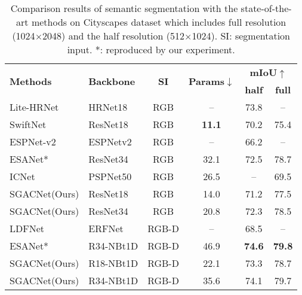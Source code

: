 \documentclass[journal,twoside,web]{ieeecolor}
\begin{document}
\begin{table}[!t]
	\centering
	\renewcommand{\arraystretch}{1.08}\caption{Comparison results of semantic segmentation with the state-of-the-art methods on Cityscapes dataset which includes full resolution (1024$\times$2048) and the half resolution (512$\times$1024). SI: segmentation input. *: reproduced by our experiment.}
	\footnotesize
	\begin{tabular}{llcccc}
		\toprule \multicolumn{1}{l}{\multirow{2}{*}{\textbf{Methods}}}     &
		\multicolumn{1}{l}{\multirow{2}{*}{\textbf{Backbone}}}     &
		\multicolumn{1}{c}{\multirow{2}{*}{\textbf{SI}}}     &
		\multicolumn{1}{c}{\multirow{2}{*}{\textbf{Params}$\downarrow$}} 						&
		\multicolumn{2}{c}{\textbf{mIoU$\uparrow$}} \\ 
		\cmidrule(r){5-6} 
		\multicolumn{4}{c}{}                                  &      
		\multicolumn{1}{c}{\textbf{half}}      & 
		\multicolumn{1}{c}{\textbf{full}}	     \\ 
		\midrule
Lite-HRNet~\cite{Lite-HRNet}       & HRNet18          & RGB   & --  &  73.8 &  --       \\
		SwiftNet~\cite{SwiftNet}           & ResNet18   	& RGB   & \textbf{11.1}&  70.2 & 75.4     \\
      ESPNet-v2~\cite{ESPNetv2}          & ESPNetv2   	& RGB   & --  &  66.2 &  --       \\
      ESANet*~\cite{ESANet}              & ResNet34      & RGB   & 32.1&  72.5 & 78.7    \\
		ICNet~\cite{ICNet}                 & PSPNet50  	& RGB   & 26.5 &   --  & 69.5       \\
		SGACNet(Ours)                      & ResNet18  	& RGB   & 14.0&  71.2 &77.5 \\
		SGACNet(Ours)                      & ResNet34  	& RGB   & 20.8&  72.3 & 78.5    \\ 
		\midrule
		LDFNet~\cite{LDFNet}               & ERFNet 	    & RGB-D &  -- &  68.5 & --        \\
        ESANet*~\cite{ESANet}              & R34-NBt1D      & RGB-D & 46.9&  \textbf{74.6} & \textbf{79.8}    \\
\midrule
		SGACNet(Ours)                      & R18-NBt1D      & RGB-D & 22.1&  73.3 & 78.7 \\
		SGACNet(Ours)                      & R34-NBt1D     & RGB-D & 35.6&  74.1 & 79.7  \\
		\bottomrule
	\end{tabular}\label{tab:city}\end{table}
\end{document}
